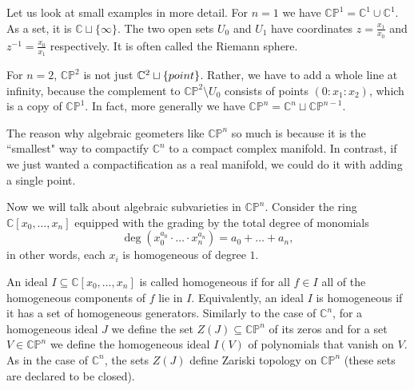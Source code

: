 \documentclass[11pt]{article}
\numberwithin{equation}{section}
\numberwithin{footnote}{section}
\newcommand{\blue}{\color{blue}}
\renewcommand{\P}{{\mathbb P}}
\newcommand{\C}{{\mathbb C}}
\begin{document}
Let us look at small examples in more detail. For $n=1$ we have $\C\P^1 = \C^1\cup \C^1$. As a set, it is $\C\sqcup\{\infty\}$. The
two open sets $U_0$ and $U_1$ have coordinates $z = \frac {x_1}{x_0}$ and $z^{-1} = \frac {x_0}{x_1}$ respectively. 
It is often called the Riemann sphere. 



For $n=2$,  $\C\P^2$ is not just $\C^2\sqcup \{{\rm point}\}$. Rather, we have to add a whole line at infinity, because the complement to 
$\C\P^2 \setminus U_0$ consists of points $(0:x_1:x_2)$, which is a copy of $\C\P^1$. In fact, more generally we have 
$\C\P^n = \C^n\sqcup \C\P^{n-1}$.


\smallskip
The reason why algebraic geometers like $\C\P^n$ so much is because it is the ``smallest" way to compactify $\C^n$ to a compact complex manifold. In contrast, if we just wanted a compactification as a real manifold, we could do it with adding a single point.

\smallskip
Now  we will talk about algebraic subvarieties in $\C\P^n$. Consider the ring $\C[x_0,\ldots,x_n]$ equipped with the grading by the total degree of monomials
$$
\deg  \left(x_0^{a_0}\cdot\ldots \cdot x_n^{a_n}\right) = a_0+\ldots + a_n,
$$
in other words, each $x_i$ is homogeneous of degree $1$. 

\smallskip
An ideal $I \subseteq \C[x_0,\ldots,x_n]$ is called {\blue homogeneous} if for all $f\in I$ all of the homogeneous components of $f$ lie in $I$. Equivalently, an ideal $I$ is homogeneous if it has a set of homogeneous generators.
Similarly to the case of $\C^n$,  for a homogeneous ideal $J$ we define the set $Z(J)\subseteq \C\P^n$ of its zeros and for a set $V\in \C\P^n$ we define the homogeneous ideal $I(V)$ of polynomials that vanish on $V$. As in the case of $\C^n$, the sets $Z(J)$ define Zariski topology on $\C\P^n$ (these sets are declared to be closed). 
\end{document}
